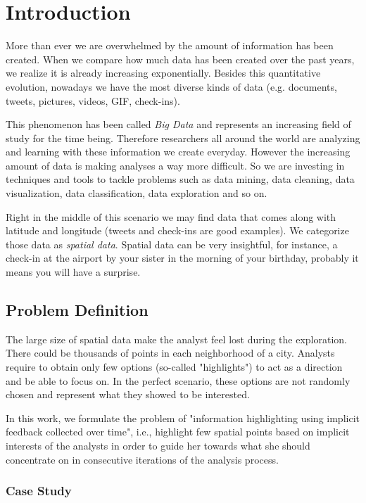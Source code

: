 \chapter{Introduction}
\label{chap:intro}

More than ever we are overwhelmed by the amount of information has been created.
When we compare how much data has been created over the past years, we realize
it is already increasing exponentially.
Besides this quantitative evolution, nowadays
we have the most diverse kinds of data
(e.g. documents, tweets, pictures, videos, GIF, check-ins).

This phenomenon has been called \textit{Big Data} and represents an increasing field of study
for the time being. Therefore researchers all around the world
are analyzing and learning with these information we create everyday.
However the increasing amount of data is making analyses a way more difficult.
So we are investing in techniques and tools to tackle problems such as data mining, data cleaning,
data visualization, data classification, data exploration and so on.

Right in the middle of this scenario we may find data that comes along with latitude and longitude
(tweets and check-ins are good examples). We categorize those data as \textit{spatial data}.
Spatial data can be very insightful, for instance, a check-in at the airport by your sister
in the morning of your birthday, probably it means you will have a surprise.

\section{Problem Definition}

The large size of spatial data make the analyst feel lost during the exploration.
There could be thousands of points in each neighborhood of a city. Analysts require to obtain
only few options (so-called "highlights") to act as a direction and be able to focus on.
In the perfect scenario, these options are not randomly chosen and represent what they showed to be interested.

In this work, we formulate the problem of "information highlighting using implicit feedback collected over time", i.e.,
highlight few spatial points based on implicit interests of the analysts in order to guide her
towards what she should concentrate on in consecutive iterations of the analysis process.

\subsection{Case Study}

